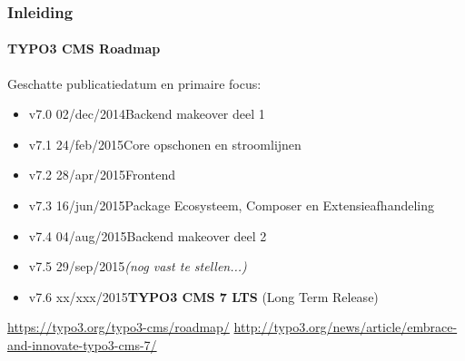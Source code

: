 \begin{frame}[fragile]
	\frametitle{Inleiding}
	\framesubtitle{TYPO3 CMS Roadmap}

	Geschatte publicatiedatum en primaire focus:

	\begin{itemize}
		\item v7.0 \tabto{1.0cm}02/dec/2014\tabto{3.4cm}Backend makeover deel 1
		\item v7.1 \tabto{1.0cm}24/feb/2015\tabto{3.4cm}Core opschonen en stroomlijnen
		\item v7.2 \tabto{1.0cm}28/apr/2015\tabto{3.4cm}Frontend
		\item v7.3 \tabto{1.0cm}16/jun/2015\tabto{3.4cm}Package Ecosysteem, Composer\newline
			\tabto{3.4cm}en Extensieafhandeling
		\item
			\begingroup
				\color{typo3orange}
					v7.4 \tabto{1.0cm}04/aug/2015\tabto{3.4cm}Backend makeover deel 2
			\endgroup

		\item v7.5 \tabto{1.0cm}29/sep/2015\tabto{3.4cm}\textit{(nog vast te stellen...)}
		\item v7.6 \tabto{1.0cm}xx/xxx/2015\tabto{3.4cm}\textbf{TYPO3 CMS 7 LTS} (Long Term Release)
	\end{itemize}

	\smaller
		\url{https://typo3.org/typo3-cms/roadmap/}\newline
		\url{http://typo3.org/news/article/embrace-and-innovate-typo3-cms-7/}
	\normalsize

\end{frame}

